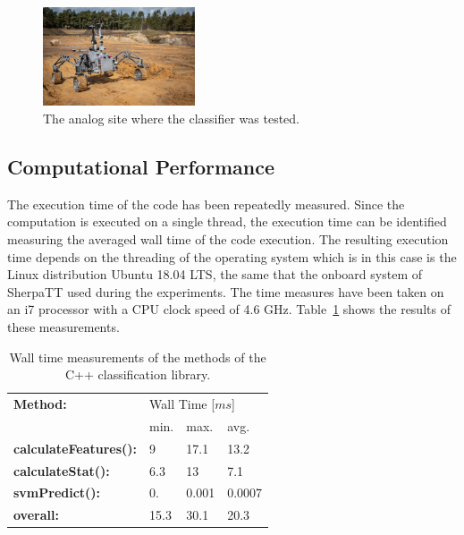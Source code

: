 \documentclass{article}
\begin{document}
\begin{figure}[!htbp]
    \centering
        \includegraphics[width=0.4\textwidth]{../figures/sandmine_v2.jpg}
    \caption{The analog site where the classifier was tested.}
    \label{fig:finaltest}
\end{figure}

\FloatBarrier

\subsection{Computational Performance}

The execution time of the code has been repeatedly measured. 
Since the computation is executed on a single thread, the execution time can be identified measuring the averaged wall time of the code execution. 
The resulting execution time depends on the threading of the operating system which is in this case is the Linux distribution Ubuntu 18.04 LTS, the same that the onboard system of SherpaTT used during the experiments. 
The time measures have been taken on an i7 processor with a CPU clock speed of 4.6 GHz. 
Table~\ref{table:compmeasurments} shows the results of these measurements. 


\begin{table}[htb!]
   \centering
    \begin{tabularx}{\columnwidth}{X|XXX}
        \textbf{Method:} & \multicolumn{3}{X}{Wall Time [$ms$]} \\
        &min.&max.&avg.\\
        \hline
        \hline
        \textbf{calculateFeatures():} & 9&  17.1& 13.2 \\
        \textbf{calculateStat():}     & 6.3 & 13 & 7.1 \\
        \textbf{svmPredict():}        &  0. &  0.001 & 0.0007  \\
        \hline
        \textbf{overall:}             & 15.3 & 30.1 &20.3  \\
    \end{tabularx}	
    \caption{Wall time measurements of the methods of the C++ classification library.}
    \label{table:compmeasurments}
\end{table}
\end{document}
